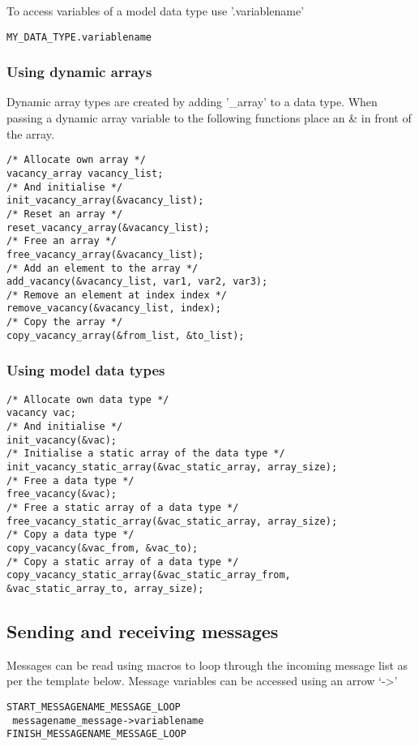 To access variables of a model data type use '.variablename'

\begin{mylisting}
\begin{verbatim}
MY_DATA_TYPE.variablename
\end{verbatim}
\end{mylisting}

\subsubsection{Using dynamic arrays}

Dynamic array types are created by adding '\_array' to a data type.
When passing a dynamic array variable to the following functions place an \& in
front of the array.

\begin{mylisting}
\begin{verbatim}
/* Allocate own array */
vacancy_array vacancy_list;
/* And initialise */
init_vacancy_array(&vacancy_list);
/* Reset an array */
reset_vacancy_array(&vacancy_list);
/* Free an array */
free_vacancy_array(&vacancy_list);
/* Add an element to the array */
add_vacancy(&vacancy_list, var1, var2, var3);
/* Remove an element at index index */
remove_vacancy(&vacancy_list, index);
/* Copy the array */
copy_vacancy_array(&from_list, &to_list);
\end{verbatim}
\end{mylisting}

\subsubsection{Using model data types}

\begin{mylisting}
\begin{verbatim}
/* Allocate own data type */
vacancy vac;
/* And initialise */
init_vacancy(&vac);
/* Initialise a static array of the data type */
init_vacancy_static_array(&vac_static_array, array_size);
/* Free a data type */
free_vacancy(&vac);
/* Free a static array of a data type */
free_vacancy_static_array(&vac_static_array, array_size);
/* Copy a data type */
copy_vacancy(&vac_from, &vac_to);
/* Copy a static array of a data type */
copy_vacancy_static_array(&vac_static_array_from, &vac_static_array_to, array_size);
\end{verbatim}
\end{mylisting}

\subsection{Sending and receiving messages}

Messages can be read using macros to loop through the incoming message list as per the template below.
Message variables can be accessed using an arrow `->'

\begin{mylisting}
\begin{verbatim}
START_MESSAGENAME_MESSAGE_LOOP
 messagename_message->variablename
FINISH_MESSAGENAME_MESSAGE_LOOP
\end{verbatim}
\end{mylisting}